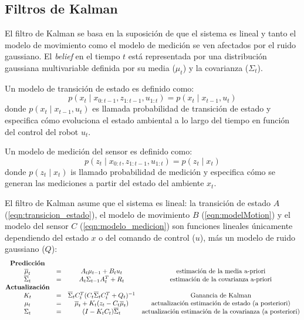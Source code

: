 \subsection{Filtros de Kalman}

El filtro de Kalman se basa en la suposición de que el sistema es lineal y 
tanto el modelo de movimiento como el modelo de medición se ven afectados por 
el ruido gaussiano. El \textit{belief} en el tiempo $t$ está representada por 
una distribución gaussiana multivariable definida por su media ($\mu_{t}$) y la 
covarianza ($\Sigma_{t}$).

Un modelo de transici\'on de estado es definido como:
\begin{equation}
\label{eqn:transicion_estado}
p(x_{t}\mid x_{0:t-1}, z_{1:t-1}, u_{1:t}) = p(x_{t}\mid x_{t-1}, u_{t})
\end{equation}
donde $p(x_{t}\mid x_{t-1}, u_{t})$ es llamada probabilidad de transición 
de estado y especifica cómo evoluciona el estado ambiental a lo largo 
del tiempo en función del control del robot $u_{t}$.

Un modelo de medici\'on del sensor es definido como:
\begin{equation}
\label{eqn:modelo_medicion}
p(z_{t}\mid x_{0:t}, z_{1:t-1}, u_{1:t}) = p (z_{t}\mid x_{t})
\end{equation}
donde $p(z_{t}\mid x_{t})$ is llamado probabilidad de medición y especifica 
cómo se generan las mediciones a partir del estado del ambiente $x_{t}$.

El filtro de Kalman asume que el sistema es lineal: la transición de estado 
$A$ (\ref{eqn:transicion_estado}), el modelo de movimiento $B$ (\ref{eqn:modelMotion})  
y el modelo del sensor $C$ (\ref{eqn:modelo_medicion}) son funciones lineales únicamente 
dependiendo del estado $x$ o del comando de control ($u$), más un modelo 
de ruido gaussiano ($Q$):
\begin{equation}
\label{eqn: Kalman Filter}
\begin{matrix}
\textrm{\textbf{Predicción}}\\
\overline{\mu}_{t} &= &A_{t}\mu_{t-1} + B_{t} u_{t} &\textrm{estimación de la media a-priori}\\
\overline{\Sigma}_{t} &= &A_{t}\Sigma_{t-1} A_{t}^{T} + R_{t} &\textrm{estimación de la covarianza a-priori}\\
\textrm{\textbf{Actualización}}\\
K_{t} &= &\overline{\Sigma}_{t}C_{t}^{T}(C_{t}\overline{\Sigma}_{t}C_{t}^{T} + Q_{t})^{-1} &\textrm{Ganancia de Kalman}\\
\mu_{t} &= &\overline{\mu}_{t} + K_{t}(z_{t} - C_{t}\overline{\mu}_{t}) &\textrm{actualización estimación de estado (a posteriori)}\\
\Sigma_{t} &= &(I - K_{t}C_{t})\overline{\Sigma}_{t} &\textrm{actualización estimación de la covarianza (a posteriori)}\\
\end{matrix}
\end{equation}

